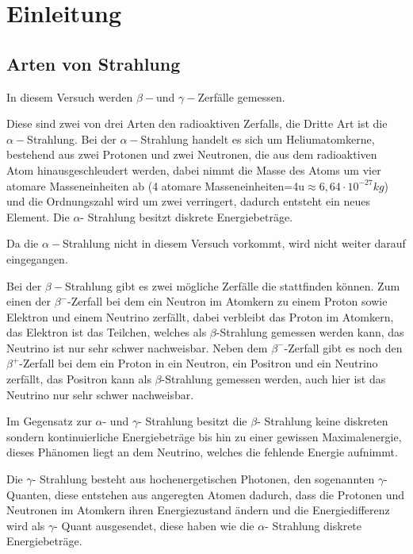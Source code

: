 \section{Einleitung}


\subsection{Arten von Strahlung}

In diesem Versuch werden $\beta-$und $\gamma-$Zerfälle gemessen.

Diese sind zwei von drei Arten den radioaktiven Zerfalls, die Dritte
Art ist die $\alpha-$Strahlung. Bei der $\alpha-$Strahlung handelt
es sich um Heliumatomkerne, bestehend aus zwei Protonen und zwei Neutronen,
die aus dem radioaktiven Atom hinausgeschleudert werden, dabei nimmt
die Masse des Atoms um vier atomare Masseneinheiten ab (4 atomare
Masseneinheiten=4u$\approx6,64\cdot10^{-27}kg$) und die Ordnungszahl
wird um zwei verringert, dadurch entsteht ein neues Element. Die $\alpha$-
Strahlung besitzt diskrete Energiebeträge.

Da die $\alpha-$Strahlung nicht in diesem Versuch vorkommt, wird
nicht weiter darauf eingegangen.

Bei der $\beta-$Strahlung gibt es zwei mögliche Zerfälle die stattfinden
können. Zum einen der $\beta^{-}$-Zerfall bei dem ein Neutron im
Atomkern zu einem Proton sowie Elektron und einem Neutrino zerfällt,
dabei verbleibt das Proton im Atomkern, das Elektron ist das Teilchen,
welches als $\beta$-Strahlung gemessen werden kann, das Neutrino
ist nur sehr schwer nachweisbar. Neben dem $\beta^{-}$-Zerfall gibt
es noch den $\beta^{+}$-Zerfall bei dem ein Proton in ein Neutron,
ein Positron und ein Neutrino zerfällt, das Positron kann als $\beta$-Strahlung
gemessen werden, auch hier ist das Neutrino nur sehr schwer nachweisbar.

Im Gegensatz zur $\alpha$- und $\gamma$- Strahlung besitzt die $\beta$-
Strahlung keine diskreten sondern kontinuierliche Energiebeträge bis
hin zu einer gewissen Maximalenergie, dieses Phänomen liegt an dem
Neutrino, welches die fehlende Energie aufnimmt.

Die $\gamma$- Strahlung besteht aus hochenergetischen Photonen, den
sogenannten $\gamma$- Quanten, diese entstehen aus angeregten Atomen
dadurch, dass die Protonen und Neutronen im Atomkern ihren Energiezustand
ändern und die Energiedifferenz wird als $\gamma$- Quant ausgesendet,
diese haben wie die $\alpha$- Strahlung diskrete Energiebeträge.


